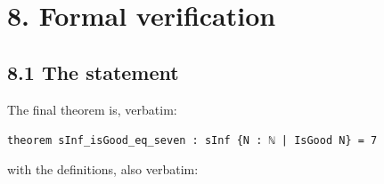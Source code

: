 \documentclass[11pt,a4paper]{article}
\theoremstyle{named}
\begin{document}
\section*{8. Formal verification}

\subsection*{8.1 The statement}

The final theorem is, verbatim:

\begin{leancode}
\item \texttt{theorem\ \allowbreak{}sInf\_\allowbreak{}isGood\_\allowbreak{}eq\_\allowbreak{}seven\ \allowbreak{}:\ \allowbreak{}sInf\ \allowbreak{}\{N\ \allowbreak{}:\ \allowbreak{}ℕ\ \allowbreak{}|\ \allowbreak{}IsGood\ \allowbreak{}N\}\ \allowbreak{}=\ \allowbreak{}7}
\end{leancode}

with the definitions, also verbatim:
\end{document}
